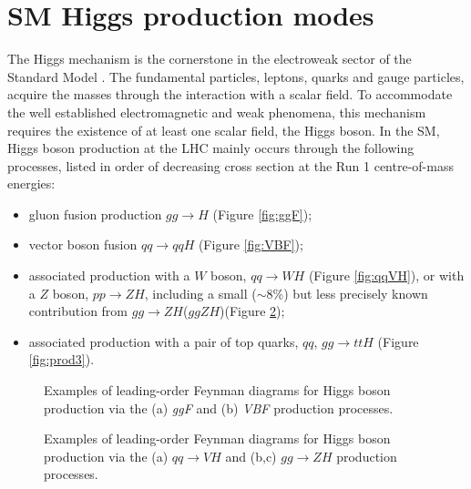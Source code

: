 \documentclass[a4paper, oneside, 11pt, openright]{book}
\begin{document}
 		\section{SM Higgs production modes}
 			The Higgs mechanism is the cornerstone in the electroweak sector of the Standard Model \cite{weinberg_1995}. The fundamental particles, leptons, quarks and gauge particles, acquire the masses through the interaction with a scalar ﬁeld. To accommodate the well established electromagnetic and weak phenomena, this mechanism requires the existence of at least one scalar ﬁeld, the Higgs boson. In the SM, Higgs boson production \cite{higgs_prod} at the LHC mainly occurs through the following processes, listed in order of decreasing cross section at the Run 1 centre-of-mass energies:
 			\begin{itemize}
 				\item gluon fusion production $gg\to H$ (Figure \ref{fig:ggF});
 				\item vector boson fusion $qq\to qqH$ (Figure \ref{fig:VBF});
 				\item associated production with a $W$ boson, $qq\to WH$ (Figure \ref{fig:qqVH}), or with a $Z$ boson, $pp\to ZH$, including a small ($\sim$8\%) but less precisely known contribution from $gg\to ZH$($ggZH$)(Figure \ref{fig:prod2});
 				\item associated production with a pair of top quarks, $qq$, $gg\to ttH$ (Figure \ref{fig:prod3}).
 			\end{itemize}
 			\begin{figure}
 				\centering
 				\caption{Examples of leading-order Feynman diagrams for Higgs boson production via the (a) \textit{ggF} and (b) \textit{VBF} production processes.}
 				\label{fig:prod1}
 			\end{figure}
 			\begin{figure}
 				\centering
 				\hspace{.2cm}
 				\hspace{.2cm}				
 				\caption{Examples of leading-order Feynman diagrams for Higgs boson production via the (a) $qq\to VH$ and (b,c) $gg\to ZH$ production processes.}
 				\label{fig:prod2}
 			\end{figure}
\end{document}
